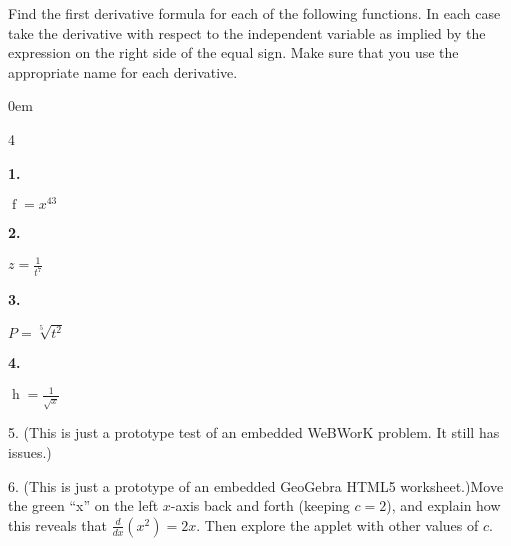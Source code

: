 \documentclass[12pt,]{book}
\theoremstyle{plain}
\theoremstyle{definition}
\numberwithin{equation}{section}
\newenvironment{exercisegroup}%
{\medskip\noindent}%
{\par\bigskip}%
\newlength{\exercisegroupindent}%
\newlength{\exercisegroupitemwidth}%
\newenvironment{exercisegrouplist}%
{\vspace{-\partopsep}%
\begin{adjustwidth}{\exercisegroupindent}{0em}}%
{\end{adjustwidth}%
\vspace{-\partopsep}%
\vspace{\baselineskip}}%
\newenvironment{exercisegroupbycol}[1]%
{\begin{exercisegrouplist}%
\vspace{-\multicolsep}%
\begin{multicols}{#1}%
\setlength{\parindent}{0em}%
\setlength{\exercisegroupitemwidth}{\linewidth}}%
{\end{multicols}%
\vspace{-\multicolsep}%
\end{exercisegrouplist}}%
\newenvironment{exercisegroupitem}[1]%
{\begin{minipage}[t]{\exercisegroupitemwidth}
\vspace{0pt}%
{\bfseries#1}%
\rule{0pt}{\baselineskip}}{\strut%
\end{minipage}%
\hspace{\columnsep}}%
\providecommand\phantomsection{}
\newcommand{\fe}[2]{\mathop{{#1}{\left(#2\right)}}}
\newcommand{\lzoo}[2]{{\frac{d}{d#1}}{\left(#2\right)}}
\begin{document}
\begin{exercisegroup}%
Find the first derivative formula for each of the following functions.  In each case take the derivative with respect to the independent variable as implied by the expression on the right side of the equal sign.  Make sure that you use the appropriate name for each derivative.%
\begin{exercisegroupbycol}{4}%
\begin{exercisegroupitem}{1. }\phantomsection\hypertarget{exercise-230}{\null}
\(\fe{f}{x}=x^{43}\)%
\end{exercisegroupitem}%
\par%
\begin{exercisegroupitem}{2. }\phantomsection\hypertarget{exercise-231}{\null}
\(z=\frac{1}{t^{7}}\)%
\end{exercisegroupitem}%
\par%
\begin{exercisegroupitem}{3. }\phantomsection\hypertarget{exercise-232}{\null}
\(P=\sqrt[5]{t^2}\)%
\end{exercisegroupitem}%
\par%
\begin{exercisegroupitem}{4. }\phantomsection\hypertarget{exercise-233}{\null}
\(\fe{h}{x}=\frac{1}{\sqrt{x}}\)%
\end{exercisegroupitem}%
\par%
\end{exercisegroupbycol}%
\end{exercisegroup}%
\begin{exerciselist}
\item[5.]\phantomsection\hypertarget{exercise-234}{\null}(This is just a prototype test of an embedded WeBWorK problem. It still has issues.)\space\space{}\par\smallskip
\item[6.]\phantomsection\hypertarget{exercise-235}{\null}(This is just a prototype of an embedded GeoGebra HTML5 worksheet.)\space\space{}Move the green ``x'' on the left \(x\)-axis back and forth (keeping \(c=2\)), and explain how this reveals that \(\lzoo{x}{x^2}=2x\). Then explore the applet with other values of \(c\).%
\par\smallskip
\end{exerciselist}
\typeout{************************************************}
\typeout{************************************************}
\end{document}
